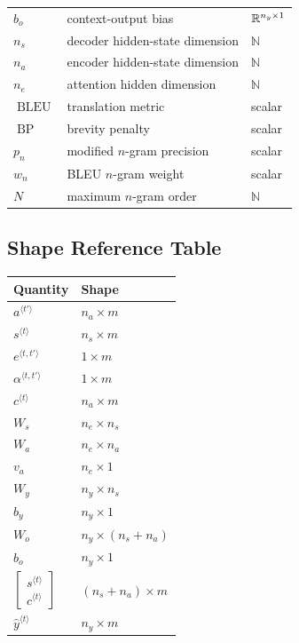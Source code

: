 \begin{center}
\begin{tabular}{lll}
$b_o$ & context-output bias & $\mathbb{R}^{n_y \times 1}$ \\
$n_s$ & decoder hidden-state dimension & $\mathbb{N}$ \\
$n_a$ & encoder hidden-state dimension & $\mathbb{N}$ \\
$n_e$ & attention hidden dimension & $\mathbb{N}$ \\
$\operatorname{BLEU}$ & translation metric & scalar \\
$\operatorname{BP}$ & brevity penalty & scalar \\
$p_n$ & modified $n$-gram precision & scalar \\
$w_n$ & BLEU $n$-gram weight & scalar \\
$N$ & maximum $n$-gram order & $\mathbb{N}$ \\
\bottomrule
\end{tabular}
\end{center}

\subsection{Shape Reference Table}

\begin{center}
\begin{tabular}{ll}
\toprule
Quantity & Shape \\
\midrule
$a^{\langle t'\rangle}$ & $n_a \times m$ \\
$s^{\langle t\rangle}$ & $n_s \times m$ \\
$e^{\langle t,t'\rangle}$ & $1 \times m$ \\
$\alpha^{\langle t,t'\rangle}$ & $1 \times m$ \\
$c^{\langle t\rangle}$ & $n_a \times m$ \\
$W_s$ & $n_e \times n_s$ \\
$W_a$ & $n_e \times n_a$ \\
$v_a$ & $n_e \times 1$ \\
$W_y$ & $n_y \times n_s$ \\
$b_y$ & $n_y \times 1$ \\
$W_o$ & $n_y \times (n_s+n_a)$ \\
$b_o$ & $n_y \times 1$ \\
$\begin{bmatrix}s^{\langle t\rangle}\\ c^{\langle t\rangle}\end{bmatrix}$ & $(n_s+n_a) \times m$ \\
$\hat{y}^{\langle t\rangle}$ & $n_y \times m$ \\
\bottomrule
\end{tabular}
\end{center}
